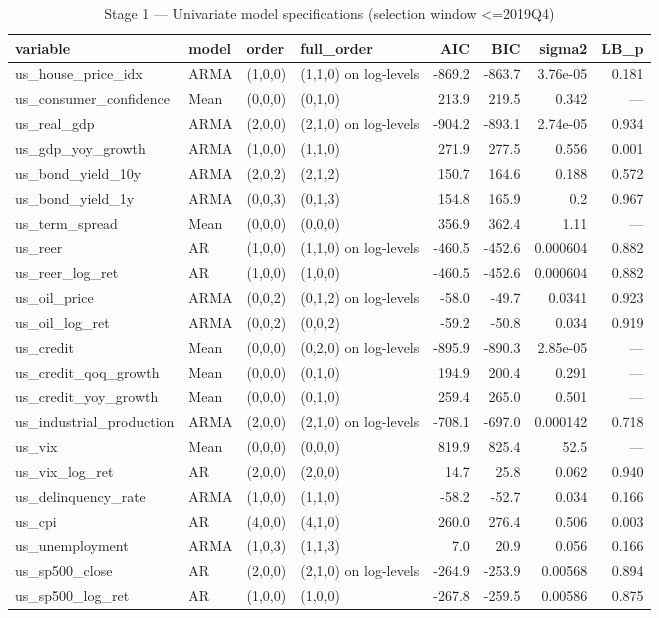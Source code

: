 \begin{table}[htbp]
\centering
\caption{Stage 1 — Univariate model specifications (selection window <=2019Q4)}
\label{tab:model_specs}
\begin{tabular}{llllrrrr}
\toprule
variable & model & order & full\_order & AIC & BIC & sigma2 & LB\_p \\
\midrule
us\_house\_price\_idx & ARMA & (1,0,0) & (1,1,0) on log-levels & -869.2 & -863.7 & 3.76e-05 & 0.181 \\
us\_consumer\_confidence & Mean & (0,0,0) & (0,1,0) & 213.9 & 219.5 & 0.342 & — \\
us\_real\_gdp & ARMA & (2,0,0) & (2,1,0) on log-levels & -904.2 & -893.1 & 2.74e-05 & 0.934 \\
us\_gdp\_yoy\_growth & ARMA & (1,0,0) & (1,1,0) & 271.9 & 277.5 & 0.556 & 0.001 \\
us\_bond\_yield\_10y & ARMA & (2,0,2) & (2,1,2) & 150.7 & 164.6 & 0.188 & 0.572 \\
us\_bond\_yield\_1y & ARMA & (0,0,3) & (0,1,3) & 154.8 & 165.9 & 0.2 & 0.967 \\
us\_term\_spread & Mean & (0,0,0) & (0,0,0) & 356.9 & 362.4 & 1.11 & — \\
us\_reer & AR & (1,0,0) & (1,1,0) on log-levels & -460.5 & -452.6 & 0.000604 & 0.882 \\
us\_reer\_log\_ret & AR & (1,0,0) & (1,0,0) & -460.5 & -452.6 & 0.000604 & 0.882 \\
us\_oil\_price & ARMA & (0,0,2) & (0,1,2) on log-levels & -58.0 & -49.7 & 0.0341 & 0.923 \\
us\_oil\_log\_ret & ARMA & (0,0,2) & (0,0,2) & -59.2 & -50.8 & 0.034 & 0.919 \\
us\_credit & Mean & (0,0,0) & (0,2,0) on log-levels & -895.9 & -890.3 & 2.85e-05 & — \\
us\_credit\_qoq\_growth & Mean & (0,0,0) & (0,1,0) & 194.9 & 200.4 & 0.291 & — \\
us\_credit\_yoy\_growth & Mean & (0,0,0) & (0,1,0) & 259.4 & 265.0 & 0.501 & — \\
us\_industrial\_production & ARMA & (2,0,0) & (2,1,0) on log-levels & -708.1 & -697.0 & 0.000142 & 0.718 \\
us\_vix & Mean & (0,0,0) & (0,0,0) & 819.9 & 825.4 & 52.5 & — \\
us\_vix\_log\_ret & AR & (2,0,0) & (2,0,0) & 14.7 & 25.8 & 0.062 & 0.940 \\
us\_delinquency\_rate & ARMA & (1,0,0) & (1,1,0) & -58.2 & -52.7 & 0.034 & 0.166 \\
us\_cpi & AR & (4,0,0) & (4,1,0) & 260.0 & 276.4 & 0.506 & 0.003 \\
us\_unemployment & ARMA & (1,0,3) & (1,1,3) & 7.0 & 20.9 & 0.056 & 0.166 \\
us\_sp500\_close & AR & (2,0,0) & (2,1,0) on log-levels & -264.9 & -253.9 & 0.00568 & 0.894 \\
us\_sp500\_log\_ret & AR & (1,0,0) & (1,0,0) & -267.8 & -259.5 & 0.00586 & 0.875 \\
\bottomrule
\end{tabular}
\end{table}
